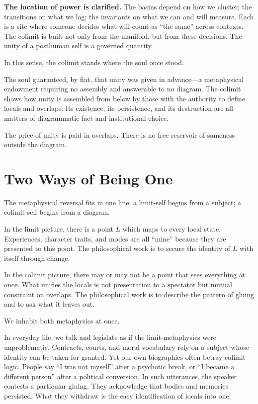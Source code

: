 \documentclass[12pt,a4paper]{article}
\begin{document}
\textbf{The location of power is clarified.} The basins depend on how we cluster; the transitions on what we log; the invariants on what we can and will measure. Each is a site where someone decides what will count as ``the same'' across contexts. The colimit is built not only from the manifold, but from these decisions. The unity of a posthuman self is a governed quantity.

In this sense, the colimit stands where the soul once stood.

The soul guaranteed, by fiat, that unity was given in advance---a metaphysical endowment requiring no assembly and answerable to no diagram. The colimit shows how unity is assembled from below by those with the authority to define locals and overlaps. Its existence, its persistence, and its destruction are all matters of diagrammatic fact and institutional choice.

The price of unity is paid in overlaps. There is no free reservoir of sameness outside the diagram.

\section{Two Ways of Being One}

The metaphysical reversal fits in one line: a limit-self begins from a subject; a colimit-self begins from a diagram.

In the limit picture, there is a point $L$ which maps to every local state. Experiences, character traits, and modes are all ``mine'' because they are presented to this point. The philosophical work is to secure the identity of $L$ with itself through change.

In the colimit picture, there may or may not be a point that sees everything at once. What unifies the locals is not presentation to a spectator but mutual constraint on overlaps. The philosophical work is to describe the pattern of gluing and to ask what it leaves out.

We inhabit both metaphysics at once.

In everyday life, we talk and legislate as if the limit-metaphysics were unproblematic. Contracts, courts, and moral vocabulary rely on a subject whose identity can be taken for granted. Yet our own biographies often betray colimit logic. People say ``I was not myself'' after a psychotic break, or ``I became a different person'' after a political conversion. In such utterances, the speaker contests a particular gluing. They acknowledge that bodies and memories persisted. What they withdraw is the easy identification of locals into one.
\end{document}
